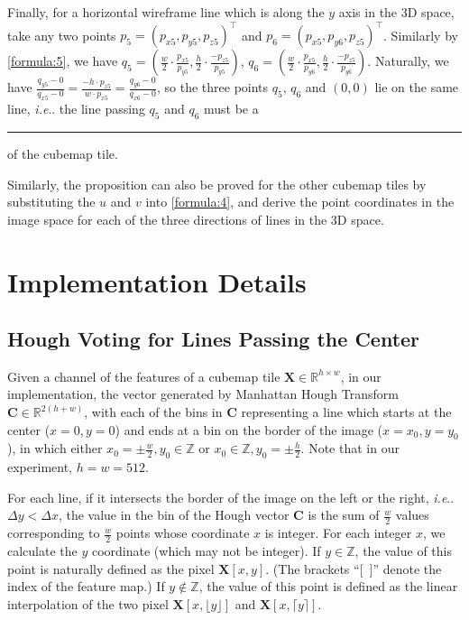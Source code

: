 \documentclass[runningheads]{llncs}
\makeatletter
\newcommand{\colorulineb}[2]{\newcommand\temp@redulineb{\bgroup\markoverwith
            {\textcolor{#1}{\rule[-0.5ex]{2pt}{0.8pt}}}\ULon}\temp@redulineb{#2}}
\DeclareRobustCommand\onedot{\futurelet\@let@token\@onedot}
\def\@onedot{\ifx\@let@token.\else.\null\fi\xspace}
\def\ie{\emph{i.e}\onedot} \def\Ie{\emph{I.e}\onedot}
\makeatother
\begin{document}
Finally, for a horizontal wireframe line which is along the $y$ axis in the 3D space, take any two points $p_5=(p_{x5}, p_{y5}, p_{z5})^\top$ and $p_6=(p_{x5}, p_{y6}, p_{z5})^\top$. Similarly by \cref{formula:5}, we have $q_5=\left(\frac{w}{2}\cdot\frac{p_{x5}}{p_{y5}}, \frac{h}{2}\cdot\frac{-p_{z5}}{p_{y5}}\right)$, $q_6=\left(\frac{w}{2}\cdot\frac{p_{x5}}{p_{y6}}, \frac{h}{2}\cdot\frac{-p_{z5}}{p_{y6}}\right)$. Naturally, we have $\frac{q_{y5}-0}{q_{x5}-0}=\frac{-h\cdot p_{z5}}{w\cdot p_{x5}}=\frac{q_{y6}-0}{q_{x6}-0}$, so the three points $q_5$, $q_6$ and $(0,0)$ lie on the same line, {\normalem \ie} the line passing $q_5$ and $q_6$ must be a \colorulineb{blue}{line that passes the center} of the cubemap tile. 

Similarly, the proposition can also be proved for the other cubemap tiles by substituting the $u$ and $v$ into \cref{formula:4}, and derive the point coordinates in the image space for each of the three directions of lines in the 3D space.



\normalem
\section{Implementation Details}
\subsection{Hough Voting for Lines Passing the Center}
\label{sec:detail_center}
Given a channel of the features of a cubemap tile $\mathbf{X}\in\mathbb{R}^{h \times w}$, in our implementation, the vector generated by Manhattan Hough Transform $\mathbf{C}\in\mathbb{R}^{2(h+w)}$, with each of the bins in $\mathbf{C}$ representing a line which starts at the center ($x=0, y=0$) and ends at a bin on the border of the image ($x=x_0, y=y_0$), in which either $x_0=\pm\frac{w}{2}, y_0\in\mathbb{Z}$ or $x_0\in\mathbb{Z}, y_0=\pm\frac{h}{2}$. Note that in our experiment, $h=w=512$.

For each line, if it intersects the border of the image on the left or the right, \ie $\Delta y < \Delta x$, the value in the bin of the Hough vector $\mathbf{C}$ is the sum of $\frac{w}{2}$ values corresponding to $\frac{w}{2}$ points whose coordinate $x$ is integer. For each integer $x$, we calculate the $y$ coordinate (which may not be integer). If $y\in\mathbb{Z}$, the value of this point is naturally defined as the pixel $\mathbf{X}[x,y]$. (The brackets ``$[$~$]$'' denote the index of the feature map.) If $y\notin\mathbb{Z}$, the value of this point is defined as the linear interpolation of the two pixel $\mathbf{X}[x,\lfloor y \rfloor]$ and $\mathbf{X}[x,\lceil y \rceil]$. 
\end{document}
